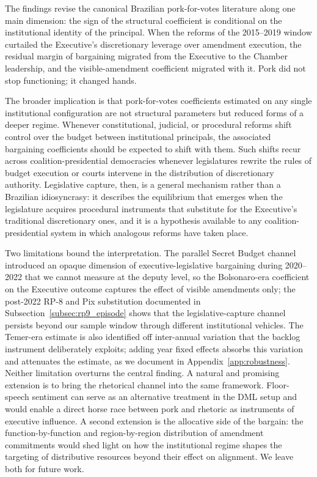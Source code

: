 \documentclass[preprint,12pt,authoryear]{elsarticle}
\begin{document}
The findings revise the canonical Brazilian pork-for-votes literature \citep{PereiraAndMueller2004,Raile2011} along one main dimension: the sign of the structural coefficient is conditional on the institutional identity of the principal. When the reforms of the 2015--2019 window curtailed the Executive's discretionary leverage over amendment execution, the residual margin of bargaining migrated from the Executive to the Chamber leadership, and the visible-amendment coefficient migrated with it. Pork did not stop functioning; it changed hands.

The broader implication is that pork-for-votes coefficients estimated on any single institutional configuration are not structural parameters but reduced forms of a deeper regime. Whenever constitutional, judicial, or procedural reforms shift control over the budget between institutional principals, the associated bargaining coefficients should be expected to shift with them. Such shifts recur across coalition-presidential democracies whenever legislatures rewrite the rules of budget execution or courts intervene in the distribution of discretionary authority. Legislative capture, then, is a general mechanism rather than a Brazilian idiosyncrasy: it describes the equilibrium that emerges when the legislature acquires procedural instruments that substitute for the Executive's traditional discretionary ones, and it is a hypothesis available to any coalition-presidential system in which analogous reforms have taken place.

Two limitations bound the interpretation. The parallel Secret Budget channel introduced an opaque dimension of executive-legislative bargaining during 2020--2022 that we cannot measure at the deputy level, so the Bolsonaro-era coefficient on the Executive outcome captures the effect of visible amendments only; the post-2022 RP-8 and Pix substitution documented in Subsection~\ref{subsec:rp9_episode} shows that the legislative-capture channel persists beyond our sample window through different institutional vehicles. The Temer-era estimate is also identified off inter-annual variation that the backlog instrument deliberately exploits; adding year fixed effects absorbs this variation and attenuates the estimate, as we document in Appendix~\ref{app:robustness}. Neither limitation overturns the central finding. A natural and promising extension is to bring the rhetorical channel into the same framework. Floor-speech sentiment can serve as an alternative treatment in the DML setup and would enable a direct horse race between pork and rhetoric as instruments of executive influence. A second extension is the allocative side of the bargain: the function-by-function and region-by-region distribution of amendment commitments would shed light on how the institutional regime shapes the targeting of distributive resources beyond their effect on alignment. We leave both for future work.
\end{document}
